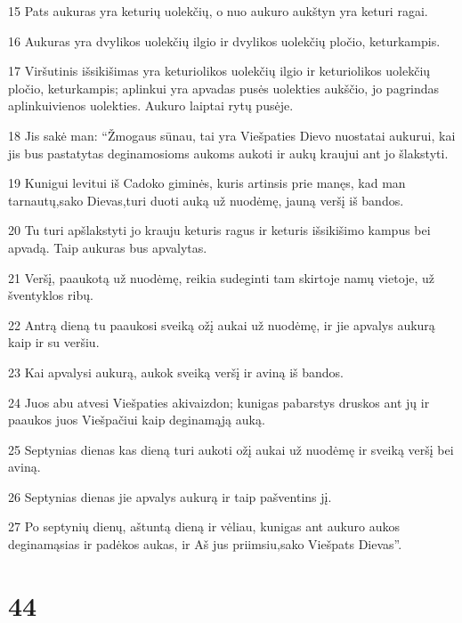 \par 15 Pats aukuras yra keturių uolekčių, o nuo aukuro aukštyn yra keturi ragai. 
\par 16 Aukuras yra dvylikos uolekčių ilgio ir dvylikos uolekčių pločio, keturkampis. 
\par 17 Viršutinis išsikišimas yra keturiolikos uolekčių ilgio ir keturiolikos uolekčių pločio, keturkampis; aplinkui yra apvadas pusės uolekties aukščio, jo pagrindas aplinkui­vienos uolekties. Aukuro laiptai rytų pusėje. 
\par 18 Jis sakė man: “Žmogaus sūnau, tai yra Viešpaties Dievo nuostatai aukurui, kai jis bus pastatytas deginamosioms aukoms aukoti ir aukų kraujui ant jo šlakstyti. 
\par 19 Kunigui levitui iš Cadoko giminės, kuris artinsis prie manęs, kad man tarnautų,­sako Dievas,­turi duoti auką už nuodėmę, jauną veršį iš bandos. 
\par 20 Tu turi apšlakstyti jo krauju keturis ragus ir keturis išsikišimo kampus bei apvadą. Taip aukuras bus apvalytas. 
\par 21 Veršį, paaukotą už nuodėmę, reikia sudeginti tam skirtoje namų vietoje, už šventyklos ribų. 
\par 22 Antrą dieną tu paaukosi sveiką ožį aukai už nuodėmę, ir jie apvalys aukurą kaip ir su veršiu. 
\par 23 Kai apvalysi aukurą, aukok sveiką veršį ir aviną iš bandos. 
\par 24 Juos abu atvesi Viešpaties akivaizdon; kunigas pabarstys druskos ant jų ir paaukos juos Viešpačiui kaip deginamąją auką. 
\par 25 Septynias dienas kas dieną turi aukoti ožį aukai už nuodėmę ir sveiką veršį bei aviną. 
\par 26 Septynias dienas jie apvalys aukurą ir taip pašventins jį. 
\par 27 Po septynių dienų, aštuntą dieną ir vėliau, kunigas ant aukuro aukos deginamąsias ir padėkos aukas, ir Aš jus priimsiu,­sako Viešpats Dievas”.



\chapter{44}


